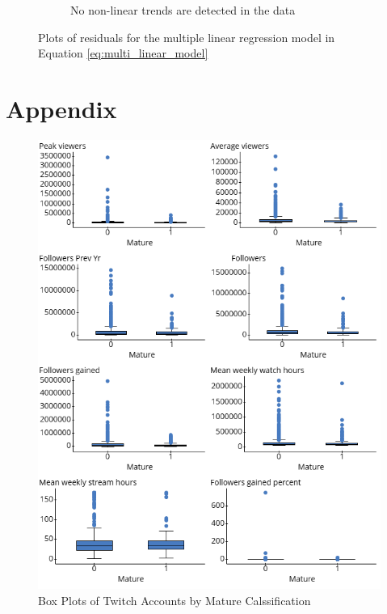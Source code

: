 \documentclass[12pt]{article}
\begin{document}
\begin{figure}
\begin{subfigure}{0.45\textwidth}
        \caption{No non-linear trends are detected in the data}
        \label{fig:plot2}
    \end{subfigure}
    \caption{Plots of residuals for the multiple linear regression model in Equation \ref{eq:multi_linear_model}}
    \label{fig:both_plots}
\end{figure}






\newpage

\section{Appendix}

\begin{figure}[H]
  \centering %
  \includegraphics[width=0.8\linewidth]{../StatCrunch_Results/mature/box_plots}
  \captionsetup{justification=centering, singlelinecheck=false, margin=2cm}
  \caption[Box Plots of Twitch Accounts by Mature Calssification]{Box Plots of Twitch Accounts by Mature Calssification}
  \label{fig:box_plots_mature}
\end{figure}
\end{document}
